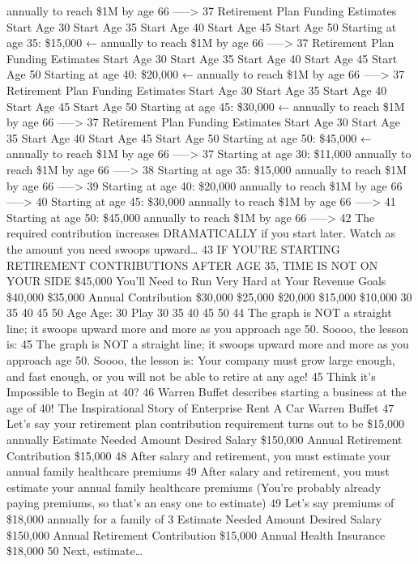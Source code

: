 \documentclass[
]{book}
\begin{document}
annually to reach
\$1M by age 66 -----\textgreater{} 37 Retirement Plan Funding Estimates Start Age 30 Start Age 35 Start Age 40 Start Age 45 Start Age 50 Starting at age 35: \$15,000 ←
annually to reach
\$1M by age 66 -----\textgreater{} 37 Retirement Plan Funding Estimates Start Age 30 Start Age 35 Start Age 40 Start Age 45 Start Age 50 Starting at age 40: \$20,000 ←
annually to reach
\$1M by age 66 -----\textgreater{} 37 Retirement Plan Funding Estimates Start Age 30 Start Age 35 Start Age 40 Start Age 45 Start Age 50 Starting at age 45: \$30,000 ←
annually to reach
\$1M by age 66 -----\textgreater{} 37 Retirement Plan Funding Estimates Start Age 30 Start Age 35 Start Age 40 Start Age 45 Start Age 50 Starting at age 50: \$45,000 ←
annually to reach
\$1M by age 66 -----\textgreater{} 37 Starting at
age 30:
\$11,000
annually to
reach \$1M by
age 66 -----\textgreater{} 38 Starting at
age 35:
\$15,000
annually to
reach \$1M by
age 66 -----\textgreater{} 39 Starting at
age 40:
\$20,000
annually to
reach \$1M by
age 66 -----\textgreater{} 40 Starting at
age 45:
\$30,000
annually to
reach \$1M by
age 66 -----\textgreater{} 41 Starting at
age 50:
\$45,000
annually to
reach \$1M by
age 66 -----\textgreater{} 42 The required contribution increases DRAMATICALLY if you start later. Watch as the amount you need swoops upward\ldots{} 43 IF YOU'RE STARTING RETIREMENT CONTRIBUTIONS AFTER AGE 35, TIME IS NOT ON YOUR SIDE \$45,000 You'll Need to Run Very Hard at Your Revenue Goals \$40,000 \$35,000
Annual Contribution \$30,000 \$25,000 \$20,000 \$15,000 \$10,000 30 35 40 45 50 Age Age: 30 Play 30 35 40 45 50 44 The graph is NOT a straight line; it swoops upward more and more as you approach age 50. Soooo, the lesson is: 45 The graph is NOT a straight line; it swoops upward more and more as you approach age 50. Soooo, the lesson is: Your company must grow large enough, and fast enough, or you will not be able to retire at any age! 45 Think it's Impossible to Begin at 40? 46 Warren Buffet describes starting a business at the age of 40! The Inspirational Story of Enterprise Rent A Car Warren Buffet 47 Let's say your retirement plan contribution requirement turns out to be \$15,000 annually Estimate Needed Amount Desired Salary \$150,000 Annual Retirement Contribution \$15,000 48 After salary and retirement, you must estimate your annual family healthcare premiums 49 After salary and retirement, you must estimate your annual family healthcare premiums
(You're probably already paying premiums, so that's an easy one to estimate) 49 Let's say premiums of \$18,000 annually for a family of 3 Estimate Needed Amount Desired Salary \$150,000 Annual Retirement Contribution \$15,000 Annual Health Insurance \$18,000 50 Next, estimate\ldots{}
\end{document}

